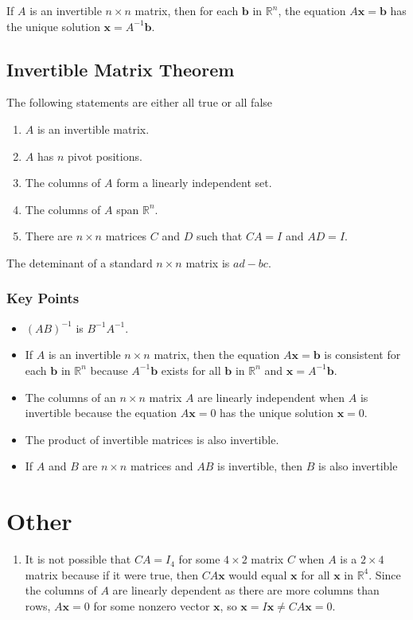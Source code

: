 \documentclass{article}
\begin{document}
If $A$ is an invertible $n\times n$ matrix, then for each $\mathbf{b}$ in $\mathbb{R}^n$, the
equation $A\mathbf{x}=\mathbf{b}$ has the unique solution $\mathbf{x}=A^{-1}\mathbf{b}$.

\subsection*{Invertible Matrix Theorem}
The following statements are either all true or all false
\begin{enumerate}
    \item $A$ is an invertible matrix.
    \item $A$ has $n$ pivot positions.
    \item The columns of $A$ form a linearly independent set.
    \item The columns of $A$ span $\mathbb{R}^n$.
    \item There are $n\times n$ matrices $C$ and $D$ such that $CA=I$ and $AD=I$.
\end{enumerate}

The deteminant of a standard $n\times n$ matrix is $ad-bc$.

\subsubsection*{Key Points}
\begin{itemize}
    \item $(AB)^{-1}$ is $B^{-1}A^{-1}$.
    \item If $A$ is an invertible $n\times n$ matrix, then the equation $A\mathbf{x}=\mathbf{b}$ is
    consistent for each $\mathbf{b}$ in $\mathbb{R}^n$ because $A^{-1}\mathbf{b}$ exists for all
    $\mathbf{b}$ in $\mathbb{R}^n$ and $\mathbf{x}=A^{-1}\mathbf{b}$.
    \item The columns of an $n\times n$ matrix $A$ are linearly independent when $A$ is invertible
    because the equation $A\mathbf{x}=0$ has the unique solution $\mathbf{x}=0$.
    \item The product of invertible matrices is also invertible.
    \item If $A$ and $B$ are $n\times n$ matrices and $AB$ is invertible, then $B$ is also
    invertible
\end{itemize}

\section*{Other}
\begin{enumerate}
    \item It is not possible that $CA=I_4$ for some $4\times 2$ matrix $C$ when $A$ is a
    $2\times 4$ matrix because if it were true, then $CA\mathbf{x}$ would equal $\mathbf{x}$ for
    all $\mathbf{x}$ in $\mathbb{R}^4$. Since the columns of $A$ are linearly dependent as there
    are more columns than rows, $A\mathbf{x}=0$ for some nonzero vector $\mathbf{x}$, so
    $\mathbf{x}=I\mathbf{x}\neq CA\mathbf{x}=0$.
\end{enumerate}
\end{document}

